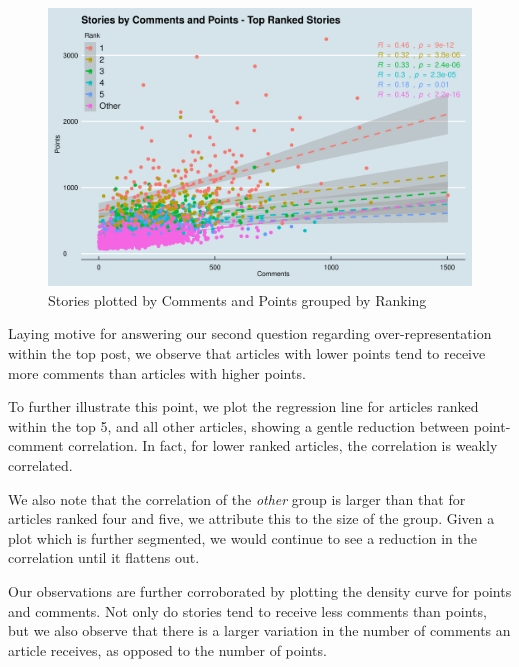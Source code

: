 \documentclass[11pt,journal,final,a4paper]{IEEEtran}
\begin{document}
\begin{figure}[!ht]
\centerline{\includegraphics[scale=0.4]{img/descriptive_02_sources_rank.png}}
\caption{Stories plotted by Comments and Points grouped by Ranking}
\label{fig2}
\end{figure}

Laying motive for answering our second question regarding over-representation within the top post, we observe that articles with lower points tend to receive more comments than articles with higher points. 

To further illustrate this point, we plot the regression line for articles ranked within the top 5, and all other articles, showing a gentle reduction between point-comment correlation. In fact, for lower ranked articles, the correlation is weakly correlated. 

We also note that the correlation of the \textit{other} group is larger than that for articles ranked four and five, we attribute this to the size of the group. Given a plot which is further segmented, we would continue to see a reduction in the correlation until it flattens out.

Our observations are further corroborated by plotting the density curve for points and comments. Not only do stories tend to receive less comments than points, but we also observe that there is a larger variation in the number of comments an article receives, as opposed to the number of points. 
\end{document}
